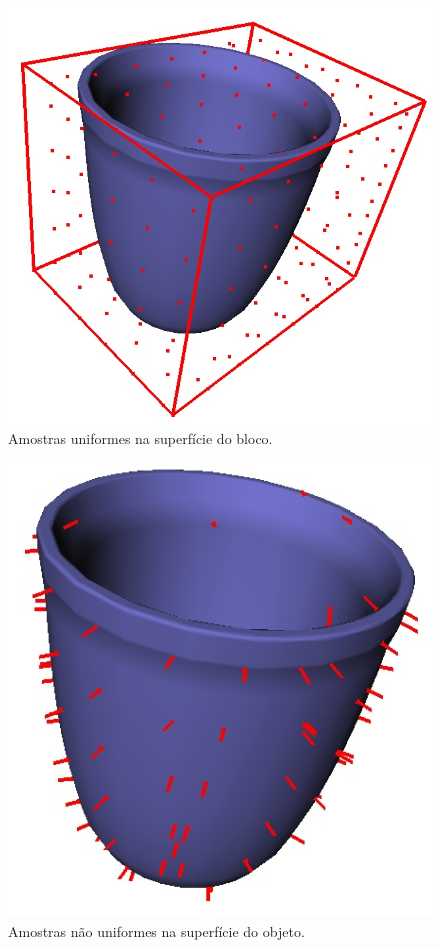 \begin{figure}[!ht]	
	\centering
	\includegraphics[width=.3\columnwidth]{figs/boundingbox.jpg}
	\caption{Amostras uniformes na superfície do bloco.}
	\label{fig::boundingbox}
\end{figure}

\begin{figure}[!ht]
	\centering	
	\includegraphics[width=.3\columnwidth]{figs/sampling.jpg}
	\caption{Amostras não uniformes na superfície do objeto.}
	\label{fig::sampling}
\end{figure}